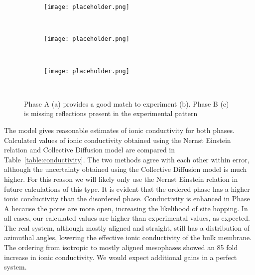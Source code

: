 \begin{figure}
	\centering
	\begin{subfigure}{.3\textwidth}
		\centering
		\texttt{[image: placeholder.png]}
		\caption{~\label{fig:xrdA}}
	\end{subfigure}
	\begin{subfigure}{.3\textwidth}
		\centering
		\texttt{[image: placeholder.png]}
		\caption{~\label{fig:xrdexp}}
	\end{subfigure}
        \begin{subfigure}{.3\textwidth}
                \centering
                \texttt{[image: placeholder.png]}
                \caption{~\label{fig:xrdB}}
        \end{subfigure}
	\caption{Phase A (a) provides a good match to experiment (b). Phase B (c) is missing reflections present in the experimental pattern} %
	\label{fig:xrd}
\end{figure}

The model gives reasonable estimates of ionic conductivity for both phases.
Calculated values of ionic conductivity obtained using the Nernst Einstein
relation and Collective Diffusion model are compared in Table~\ref{table:conductivity}.
The two methods agree with each other within error, although the 
uncertainty obtained using the Collective Diffusion model is much higher.
For this reason we will likely only use the Nernst Einstein relation
in future calculations of this type. It is evident that the ordered 
phase has a higher ionic conductivity than the disordered phase. 
Conductivity is enhanced in Phase A because the pores are more open,
increasing the likelihood of site hopping. In all cases, our calculated values
are higher than experimental values, as expected. The real system, 
although mostly aligned and straight, still has a distribution of 
azimuthal angles, lowering the effective ionic conductivity of the bulk 
membrane. The ordering from isotropic to mostly aligned mesophases 
showed an 85 fold increase in ionic conductivity. We would expect additional
gains in a perfect system.

